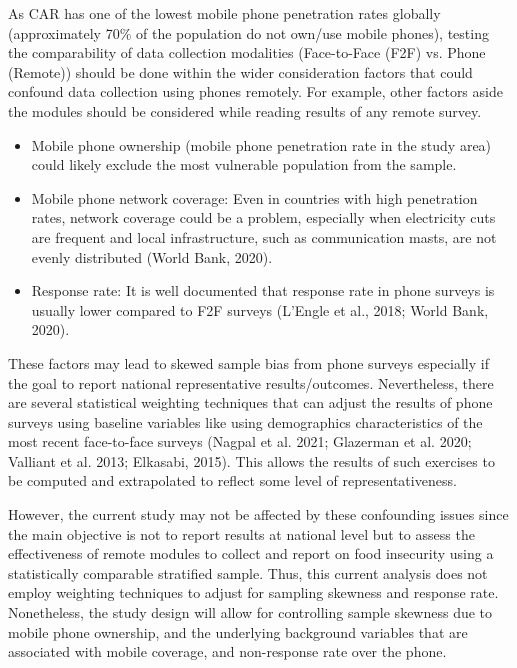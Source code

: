 \documentclass[11pt,harvard]{article}
\begin{document}
As CAR has one of the lowest mobile phone penetration rates globally (approximately 70\% of the population do not own/use mobile phones), testing the comparability of data collection modalities (Face-to-Face (F2F) vs. Phone (Remote)) should be done within the wider consideration factors that could confound data collection using phones remotely. For example, other factors aside the modules should be considered while reading results of any remote survey.
	
	\begin{itemize}[label=--, left=1.5em]
		\item[1.]	Mobile phone ownership (mobile phone penetration rate in the study area) could likely exclude the most vulnerable population from the sample. 
		\item[2.]	Mobile phone network coverage: Even in countries with high penetration rates, network coverage could be a problem, especially when electricity cuts are frequent and local infrastructure, such as communication masts, are not evenly distributed (World Bank, 2020).
		\item[3.]	Response rate: It is well documented that response rate in phone surveys is usually lower compared to F2F surveys (L’Engle et al., 2018; World Bank, 2020). 
	\end{itemize}
	
These factors may lead to skewed sample bias from phone surveys especially if the goal to report national representative results/outcomes. Nevertheless, there are several statistical weighting techniques that can adjust the results of phone surveys using baseline variables like using demographics characteristics of the most recent face-to-face surveys (Nagpal et al. 2021; Glazerman et al. 2020; Valliant et al. 2013; Elkasabi, 2015). This allows the results of such exercises to be computed and extrapolated to reflect some level of representativeness. 

However, the current study may not be affected by these confounding issues since the main objective is not to report results at national level but to assess the effectiveness of remote modules to collect and report on food insecurity using a statistically comparable stratified sample. Thus, this current analysis does not employ weighting techniques to adjust for sampling skewness and response rate. Nonetheless, the study design will allow for controlling sample skewness due to mobile phone ownership, and the underlying background variables that are associated with mobile coverage, and non-response rate over the phone.
\end{document}
